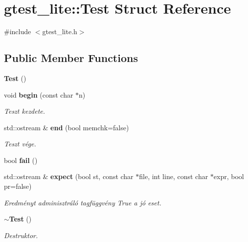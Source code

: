 \section{gtest\+\_\+lite\+:\+:Test Struct Reference}
\label{structgtest__lite_1_1_test}


{\ttfamily \#include $<$gtest\+\_\+lite.\+h$>$}

\subsection*{Public Member Functions}
\begin{DoxyCompactItemize}
\item 
\textbf{ Test} ()
\item 
void \textbf{ begin} (const char $\ast$n)
\begin{DoxyCompactList}\small\item\em Teszt kezdete. \end{DoxyCompactList}\item 
std\+::ostream \& \textbf{ end} (bool memchk=false)
\begin{DoxyCompactList}\small\item\em Teszt vége. \end{DoxyCompactList}\item 
bool \textbf{ fail} ()
\item 
std\+::ostream \& \textbf{ expect} (bool st, const char $\ast$file, int line, const char $\ast$expr, bool pr=false)
\begin{DoxyCompactList}\small\item\em Eredményt adminisztráló tagfüggvény True a jó eset. \end{DoxyCompactList}\item 
\textbf{ $\sim$\+Test} ()
\begin{DoxyCompactList}\small\item\em Destruktor. \end{DoxyCompactList}\end{DoxyCompactItemize}
